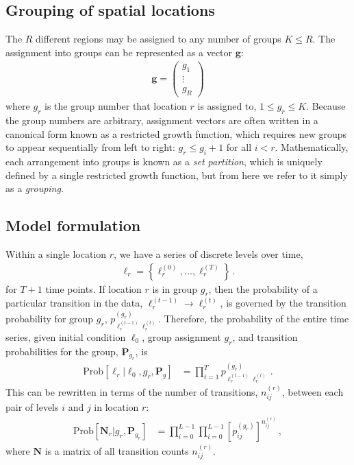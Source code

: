 \documentclass[12pt]{article}
\newcommand{\bg}{\mathbf{g}}
\newcommand{\bP}{\mathbf{P}}
\newcommand{\boldell}{\boldsymbol{\ell}}
\newcommand{\bN}{\mathbf{N}}
\newcommand{\Prob}{\mathrm{Prob}}
\begin{document}
\subsection{Grouping of spatial locations}
\label{model-grouping}

The $R$ different regions may be assigned to any number of groups $K \leq R$. The assignment into groups can be represented as a vector $\bg$:
\begin{align}
\bg = \begin{pmatrix}
  g_1 \\ \vdots \\ g_R
\end{pmatrix}
\end{align}
where $g_r$ is the group number that location $r$ is assigned to, $1 \leq g_r \leq K$. Because the group numbers are arbitrary, assignment vectors are often written in a canonical form known as a restricted growth function, which requires new groups to appear sequentially from left to right: $g_r \leq g_i + 1$ for all $i < r$. Mathematically, each arrangement into groups is known as a \emph{set partition}, which is uniquely defined by a single restricted growth function, but from here we refer to it simply as a \emph{grouping}.

\subsection{Model formulation}
\label{model-formulation}

Within a single location $r$, we have a series of discrete levels over time,
\begin{align}
	\boldell_r = \left\{ 
		\ell_r^{(0)}, \ldots, \ell_r^{(T)}
	\right\} \, .
\end{align}
for $T + 1$ time points. If location $r$ is in group $g_r$, then the probability of a particular transition in the data, $\ell_r^{(t - 1)} \rightarrow \ell_r^{(t)}$, is governed by the transition probability for group $g_r$, $p_{\ell_r^{(t-1)}\ell_r^{(t)}}^{(g_r)}$. Therefore, the probability of the entire time series, given initial condition $\ell_0$, group assignment $g_r$, and transition probabilities for the group, $\bP_{g_r}$, is
\begin{align}
	\Prob\left[\boldell_r | \ell_0, g_r, \bP_g\right]
	&= \prod_{t=1}^{T} p_{\ell_r^{(t-1)}\ell_r^{(t)}}^{(g_r)} \, .
\end{align}
This can be rewritten in terms of the number of transitions, $n_{ij}^{(r)}$, between each pair of levels $i$ and $j$ in location $r$:
\begin{align}
	\Prob\left[\bN_r | g_r, \bP_{g_r}\right]
	&= \prod_{i=0}^{L-1} \prod_{i=0}^{L-1} \left[p_{ij}^{(g_r)}\right]^{n_{ij}^{(r)}} \, ,
\end{align}
where $\bN$ is a matrix of all transition counts $n_{ij}^{(r)}$.
\end{document}

